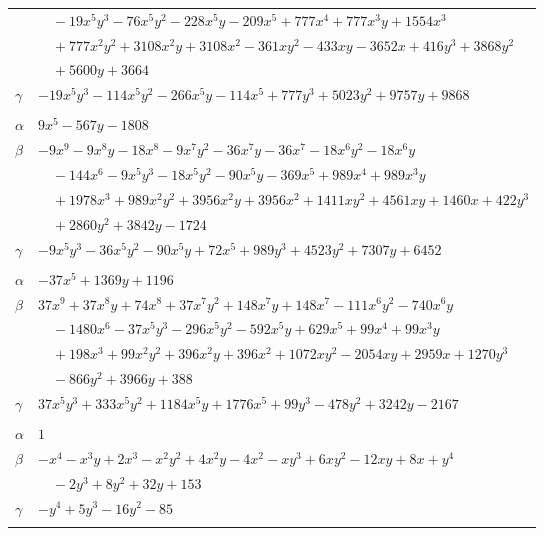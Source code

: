 \documentclass[11pt]{article}
\begin{document}
\begin{longtable}{@{}ll@{}}
 & $\quad -19x^{5}y^{3}-76x^{5}y^{2}-228x^{5}y-209x^{5}+777x^{4}+777x^{3}y+1554x^{3}$\\
 & $\quad +777x^{2}y^{2}+3108x^{2}y+3108x^{2}-361xy^{2}-433xy-3652x+416y^{3}+3868y^{2}$\\
 & $\quad +5600y+3664$\\
$\gamma$ & $-19x^{5}y^{3}-114x^{5}y^{2}-266x^{5}y-114x^{5}+777y^{3}+5023y^{2}+9757y+9868$\\
\addlinespace[3pt]
\multicolumn{2}{@{}l}{$\{i,j\}=\{15,33\}$, $k_{ij}=2^{2}\cdot 7\cdot 17^{2}$}\\
$\alpha$ & $9x^{5}-567y-1808$\\
$\beta$ & $-9x^{9}-9x^{8}y-18x^{8}-9x^{7}y^{2}-36x^{7}y-36x^{7}-18x^{6}y^{2}-18x^{6}y$\\
 & $\quad -144x^{6}-9x^{5}y^{3}-18x^{5}y^{2}-90x^{5}y-369x^{5}+989x^{4}+989x^{3}y$\\
 & $\quad +1978x^{3}+989x^{2}y^{2}+3956x^{2}y+3956x^{2}+1411xy^{2}+4561xy+1460x+422y^{3}$\\
 & $\quad +2860y^{2}+3842y-1724$\\
$\gamma$ & $-9x^{5}y^{3}-36x^{5}y^{2}-90x^{5}y+72x^{5}+989y^{3}+4523y^{2}+7307y+6452$\\
\addlinespace[3pt]
\multicolumn{2}{@{}l}{$\{i,j\}=\{15,34\}$, $k_{ij}=2^{2}\cdot 3\cdot 5\cdot 7$}\\
$\alpha$ & $-37x^{5}+1369y+1196$\\
$\beta$ & $37x^{9}+37x^{8}y+74x^{8}+37x^{7}y^{2}+148x^{7}y+148x^{7}-111x^{6}y^{2}-740x^{6}y$\\
 & $\quad -1480x^{6}-37x^{5}y^{3}-296x^{5}y^{2}-592x^{5}y+629x^{5}+99x^{4}+99x^{3}y$\\
 & $\quad +198x^{3}+99x^{2}y^{2}+396x^{2}y+396x^{2}+1072xy^{2}-2054xy+2959x+1270y^{3}$\\
 & $\quad -866y^{2}+3966y+388$\\
$\gamma$ & $37x^{5}y^{3}+333x^{5}y^{2}+1184x^{5}y+1776x^{5}+99y^{3}-478y^{2}+3242y-2167$\\
\addlinespace[3pt]
\multicolumn{2}{@{}l}{$\{i,j\}=\{16,17\}$, $k_{ij}=2^{3}\cdot 7^{2}$}\\
$\alpha$ & $1$\\
$\beta$ & $-x^{4}-x^{3}y+2x^{3}-x^{2}y^{2}+4x^{2}y-4x^{2}-xy^{3}+6xy^{2}-12xy+8x+y^{4}$\\
 & $\quad -2y^{3}+8y^{2}+32y+153$\\
$\gamma$ & $-y^{4}+5y^{3}-16y^{2}-85$\\
\addlinespace[3pt]
\multicolumn{2}{@{}l}{$\{i,j\}=\{16,23\}$, $k_{ij}=3\cdot 5\cdot 7$}\\

\end{longtable}
\end{document}
